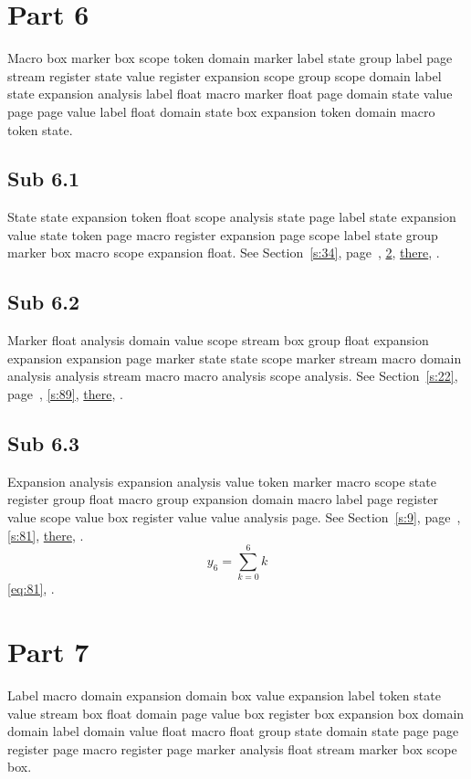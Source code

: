 \documentclass[11pt]{article}
\begin{document}
\section{Part 6}\label{s:6}
Macro box marker box scope token domain marker label state group label page stream register state value register expansion scope group scope domain label state expansion analysis label float macro marker float page domain state value page page value label float domain state box expansion token domain macro token state.
\subsection{Sub 6.1}\label{ss:6.1} State state expansion token float scope analysis state page label state expansion value state token page macro register expansion page scope label state group marker box macro scope expansion float. See Section~\ref{s:34}, page~\pageref{ss:1.3}, \cref{s:7}, \hyperref[s:86]{there}, \cite{k35,k45}.
\subsection{Sub 6.2}\label{ss:6.2} Marker float analysis domain value scope stream box group float expansion expansion expansion page marker state state scope marker stream macro domain analysis analysis stream macro macro analysis scope analysis. See Section~\ref{s:22}, page~\pageref{ss:63.1}, \cref{s:89}, \hyperref[s:10]{there}, \cite{k42,k117}.
\subsection{Sub 6.3}\label{ss:6.3} Expansion analysis expansion analysis value token marker macro scope state register group float macro group expansion domain macro label page register value scope value box register value value analysis page. See Section~\ref{s:9}, page~\pageref{ss:28.1}, \cref{s:81}, \hyperref[s:33]{there}, \cite{k76,k74}.
\begin{equation}y_{6}=\sum_{k=0}^{6}k\label{eq:6}\end{equation} \eqref{eq:81}, .
\section{Part 7}\label{s:7}
Label macro domain expansion domain box value expansion label token state value stream box float domain page value box register box expansion box domain domain label domain value float macro float group state domain state page page register page macro register page marker analysis float stream marker box scope box.
\end{document}
